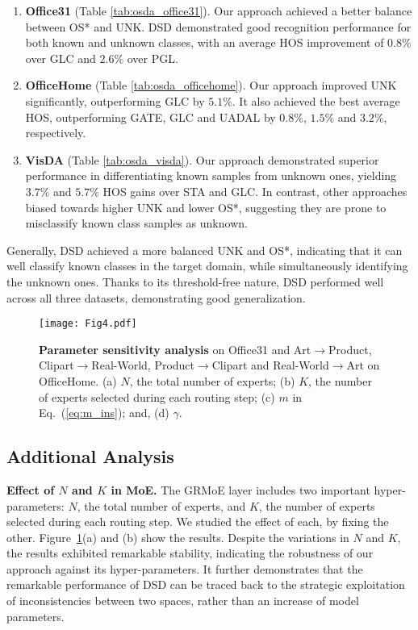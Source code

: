 \documentclass[10pt,twocolumn,letterpaper]{article}
\begin{document}
\begin{enumerate}
  \item \textbf{Office31} (Table \ref{tab:osda_office31}). Our approach achieved a better balance between OS* and UNK. DSD demonstrated good recognition performance for both known and unknown classes, with an average HOS improvement of $0.8\%$ over GLC and $2.6\%$ over PGL.
  \item \textbf{OfficeHome} (Table \ref{tab:osda_officehome}). Our approach improved UNK significantly, outperforming GLC by $5.1\%$. It also achieved the best average HOS, outperforming GATE, GLC and UADAL by $0.8\%$, $1.5\%$ and $3.2\%$, respectively.
  \item \textbf{VisDA} (Table \ref{tab:osda_visda}). Our approach demonstrated superior performance in differentiating known samples from unknown ones, yielding $3.7\%$ and $5.7\%$ HOS gains over STA and GLC. In contrast, other approaches biased towards higher UNK and lower OS*, suggesting they are prone to misclassify known class samples as unknown.
\end{enumerate}
Generally, DSD achieved a more balanced UNK and OS*, indicating that it can well classify known classes in the target domain, while simultaneously identifying the unknown ones. Thanks to its threshold-free nature, DSD performed well across all three datasets, demonstrating good generalization.

\begin{figure}[htpb]  \centering
  \texttt{[image: Fig4.pdf]}
  \caption{\textbf{Parameter sensitivity analysis} on Office31 and Art$\to$Product, Clipart$\to$Real-World, Product$\to$Clipart and Real-World$\to$Art on OfficeHome. (a) $N$, the total number of experts; (b) $K$, the number of experts selected during each routing step; (c) $m$ in Eq.~(\ref{eq:m_ins}); and, (d)  $\gamma$.}
\label{fig:sens}
\end{figure}

\subsection{Additional Analysis}

\textbf{Effect of $N$ and $K$ in MoE.}
The GRMoE layer includes two important hyper-parameters: $N$, the total number of experts, and $K$, the number of experts selected during each routing step. We studied the effect of each, by fixing the other. Figure~\ref{fig:sens}(a) and (b) show the results. Despite the variations in $N$ and $K$, the results exhibited remarkable stability, indicating the robustness of our approach against its hyper-parameters. It further demonstrates that the remarkable performance of DSD can be traced back to the strategic exploitation of inconsistencies  between two spaces, rather than an increase of model parameters.
\end{document}
